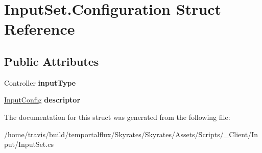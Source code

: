 \hypertarget{struct_input_set_1_1_configuration}{\section{Input\-Set.\-Configuration Struct Reference}
\label{struct_input_set_1_1_configuration}
}
\subsection*{Public Attributes}
\begin{DoxyCompactItemize}
\item 
\hypertarget{struct_input_set_1_1_configuration_a45bb253de2045a840aaccf35363032e1}{Controller {\bfseries input\-Type}}\label{struct_input_set_1_1_configuration_a45bb253de2045a840aaccf35363032e1}

\item 
\hypertarget{struct_input_set_1_1_configuration_ad800c9a54a867b08b3a1fd38773cead9}{\hyperlink{class_input_config}{Input\-Config} {\bfseries descriptor}}\label{struct_input_set_1_1_configuration_ad800c9a54a867b08b3a1fd38773cead9}

\end{DoxyCompactItemize}


The documentation for this struct was generated from the following file\-:\begin{DoxyCompactItemize}
\item 
/home/travis/build/temportalflux/\-Skyrates/\-Skyrates/\-Assets/\-Scripts/\-\_\-\-Client/\-Input/Input\-Set.\-cs\end{DoxyCompactItemize}
